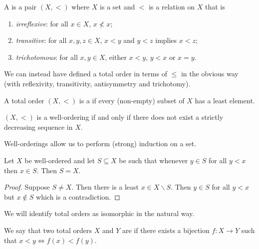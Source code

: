 \documentclass[a4paper, 10pt, twocolumn]{amsart}
\begin{document}
\begin{definition}
  A  is a pair $(X, <)$ where $X$ is a set and $<$ is a relation on $X$ that is
  \begin{enumerate}
    \item \emph{irreflexive}: for all $x \in X$, $x \not< x$;
    \item \emph{transitive}: for all $x, y, z \in X$, $x < y$ and $y < z$ implies $x < z$;
    \item \emph{trichotomous}: for all $x, y \in X$, either $x < y$, $y < x$ or $x = y$. 
  \end{enumerate}
\end{definition}

We can instead have defined a total order in terms of $\leq$ in the obvious way (with reflexivity, transitivity, antisymmetry and trichotomy). 

\begin{definition}
  A total order $(X, <)$ is a  if every (non-empty) subset of $X$ has a least element.
\end{definition}


\begin{proposition}
  $(X, <)$ is a well-ordering if and only if there does not exist a strictly decreasing sequence in $X$.
\end{proposition}

Well-orderings allow us to perform (strong) induction on a set.

\begin{proposition}
  Let $X$ be well-ordered and let $S \subseteq X$ be such that whenever $y \in S$ for all $y < x$ then $x \in S$. Then $S = X$.
\end{proposition}
\begin{proof}
  Suppose $S \neq X$. Then there is a least $x \in X \backslash S$. Then $y \in S$ for all $y < x$ but $x \not \in S$ which is a contradiction.
\end{proof}

We will identify total orders as isomorphic in the natural way.


\begin{definition}
  We say that two total orders $X$ and $Y$ are  if there exists a bijection $f: X \rightarrow Y$ such that $x < y \iff f(x) < f(y)$.
\end{definition}
\end{document}
